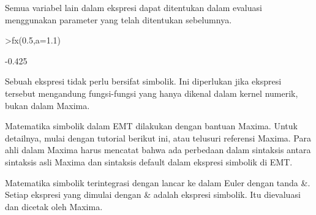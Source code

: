 \documentclass[12pt,arial,letterpaper]{book}
\begin{document}
\begin{eulercomment}
Semua variabel lain dalam ekspresi dapat ditentukan dalam evaluasi
menggunakan parameter yang telah ditentukan sebelumnya.
\end{eulercomment}
\begin{eulerprompt}
>fx(0.5,a=1.1)
\end{eulerprompt}
\begin{euleroutput}
  -0.425
\end{euleroutput}
\begin{eulercomment}
Sebuah ekspresi tidak perlu bersifat simbolik. Ini diperlukan jika
ekspresi tersebut mengandung fungsi-fungsi yang hanya dikenal dalam
kernel numerik, bukan dalam Maxima.

\begin{eulercomment}
\begin{eulercomment}
Matematika simbolik dalam EMT dilakukan dengan bantuan Maxima. Untuk
detailnya, mulai dengan tutorial berikut ini, atau telusuri referensi
Maxima. Para ahli dalam Maxima harus mencatat bahwa ada perbedaan
dalam sintaksis antara sintaksis asli Maxima dan sintaksis default
dalam ekspresi simbolik di EMT.

Matematika simbolik terintegrasi dengan lancar ke dalam Euler dengan
tanda \&. Setiap ekspresi yang dimulai dengan \& adalah ekspresi
simbolik. Itu dievaluasi dan dicetak oleh Maxima.


\end{eulercomment}
\end{eulercomment}
\end{eulercomment}
\end{document}
